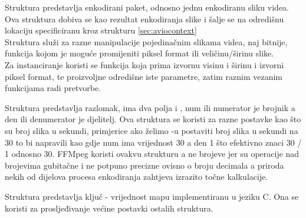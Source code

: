  \label{sec:av_packet}
Struktura  predstavlja enkodirani paket, odnosno jednu enkodiranu sliku videa. \\
Ova struktura dobiva se kao rezultat enkodiranja slike i šalje se na odredišnu lokaciju specificiranu kroz 
 strukturu \ref{sec:aviocontext} \\

 \label{sec:sws_context}
Struktura  služi za razne manipulacije pojedinačnim slikama videa, naj bitnije, funkcija
 kojom je moguće promijeniti piksel format ili veličinu/širinu slike. \\
Za instanciranje koristi se funkcija  koja prima izvornu visinu i širinu i izvorni
piksel format, te proizvoljne odredišne iste parametre, zatim raznim vezanim funkcijama radi pretvorbe.

 \label{sec:av_rational}
Struktura  predstavlja razlomak, ima dva polja  i , num ili numerator
je brojnik a den ili denumerator je djelitelj.
\paraBreak
Ova struktura se koristi za razne postavke kao što su broj slika u sekundi, primjerice ako želimo -u
postaviti broj slika u sekundi na 30 to bi napravili kao  gdje num ima vrijednost 30 a den 1 što efektivno
znaci 30 / 1 odnosno 30.
\paraBreak
FFMpeg koristi ovakvu strukturu a ne  brojeve jer su operacije nad  brojevima gubitačne
i ne potpuno precizne ovisno o broju decimala a priroda nekih od dijelova procesa enkodiranja zahtjeva izrazito 
točne kalkulacije. \cite{ffmpegDocs}

Struktura  predstavlja ključ - vrijednost mapu implementiranu u jeziku C. Ona se koristi za
prosljeđivanje većine postavki ostalih struktura.

\clearpage
